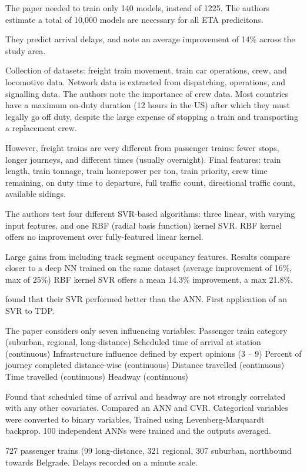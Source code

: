 \documentclass{article}
\begin{document}
The paper needed to train only 140 models, instead of 1225. The authors estimate a total of 10,000 models are necessary for all ETA predicitons. 

They predict arrival delays, and note an average improvement of 14\% across the study area. 

Collection of datasets: freight train movement, train car operations, crew, and locomotive data. Network data is extracted from dispatching, operations, and signalling data. 
The authors note the importance of crew data. Most countries have a maximum on-duty duration (12 hours in the US) after which they must legally go off duty, despite the large expense of stopping a train and transporting a replacement crew. 

However, freight trains are very different from passenger trains: fewer stops, longer journeys, and different times (usually overnight). Final features: train length, train tonnage, train horsepower per ton, train priority, crew time remaining, on duty time to departure, full traffic count, directional traffic count, available sidings. 

The authors test four different SVR-based algorithms: three linear, with varying input features, and one RBF (radial basis function) kernel SVR. RBF kernel offers no improvement over fully-featured linear kernel. 

Large gains from including track segment occupancy features. Results compare closer to a deep NN trained on the same dataset (average improvement of 16\%, max of 25\%)
RBF kernel SVR offers a mean 14.3\% improvement, a max 21.8\%.

\cite{markovic_et_al_2015} found that their SVR performed better than the ANN. First application of an SVR to TDP. 

The paper considers only seven influencing variables:
Passenger train category (suburban, regional, long-distance)
Scheduled time of arrival at station (continuous)
Infrastructure influence defined by expert opinions (3 – 9)
Percent of journey completed distance-wise (continuous)
Distance travelled (continuous)
Time travelled (continuous)
Headway (continuous)

Found that scheduled time of arrival and headway are not strongly correlated with any other covariates. Compared an ANN and CVR. Categorical variables were converted to binary variables, Trained using Levenberg-Marquardt backprop. 100 independent ANNs were trained and the outputs averaged. 

727 passenger trains (99 long-distance, 321 regional, 307 suburban, northbound towards Belgrade. Delays recorded on a minute scale. 
\end{document}

